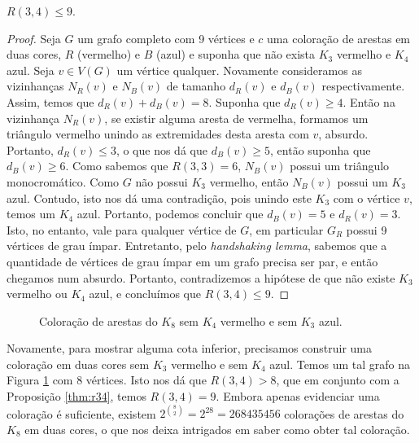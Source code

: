 \begin{proposition}
\label{thm:r34}
$R(3,4) \leq 9$.
\end{proposition}
\begin{proof}
Seja $G$ um grafo completo com 9 vértices e $c$ uma coloração de arestas em duas cores, $R$ (vermelho) e $B$ (azul) e suponha que não exista $K_3$ vermelho e $K_4$ azul. Seja $v \in V(G)$ um vértice qualquer. Novamente consideramos as vizinhanças $N_R(v)$ e $N_B(v)$ de tamanho $d_R(v)$ e $d_B(v)$ respectivamente. Assim, temos que $d_R(v) + d_B(v) = 8$. Suponha que $d_R(v) \geq 4$. Então na vizinhança $N_R(v)$, se existir alguma aresta de vermelha, formamos um triângulo vermelho unindo as extremidades desta aresta com $v$, absurdo.
Portanto, $d_R(v) \leq 3$, o que nos dá que $d_B(v) \geq 5$, então suponha que $d_B(v) \geq 6$. Como sabemos que $R(3,3) = 6$, $N_B(v)$ possui um triângulo monocromático. Como $G$ não possui $K_3$ vermelho, então $N_B(v)$ possui um $K_3$ azul. Contudo, isto nos dá uma contradição, pois unindo este $K_3$ com o vértice $v$, temos um $K_4$ azul. Portanto, podemos concluir que $d_B(v) = 5$ e $d_R(v) = 3$. Isto, no entanto, vale para qualquer vértice de $G$, em particular $G_R$ possui 9 vértices de grau ímpar.
Entretanto, pelo \emph{handshaking lemma}, sabemos que a quantidade de vértices de grau ímpar em um grafo precisa ser par, e então chegamos num absurdo. Portanto, contradizemos a hipótese de que não existe $K_3$ vermelho ou $K_4$ azul, e concluímos que $R(3,4) \leq 9$.
\end{proof}

\begin{figure}[ht!]
\centering

\caption{Coloração de arestas do $K_8$ sem $K_4$ vermelho e sem $K_3$ azul.}
\label{fig:exr34}
\end{figure}

Novamente, para mostrar alguma cota inferior, precisamos construir uma coloração em duas cores sem $K_3$ vermelho e sem $K_4$ azul. Temos um tal grafo na Figura \ref{fig:exr34} com 8 vértices. Isto nos dá que $R(3,4) > 8$, que em conjunto com a Proposição \ref{thm:r34}, temos $R(3,4) = 9$. Embora apenas evidenciar uma coloração é suficiente, existem $2^{\binom{8}{2}} = 2^{28} = 268435456$ colorações de arestas do $K_8$ em duas cores, o que nos deixa intrigados em saber como obter tal coloração.


